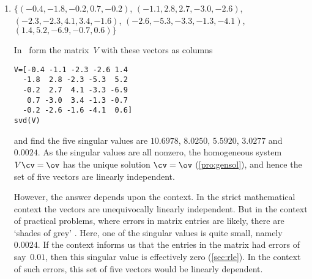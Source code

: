 \begin{example}
\begin{enumerate}



\item \(\{(-0.4,-1.8,-0.2, 0.7,-0.2)\), \((-1.1, 2.8, 2.7,-3.0,-2.6)\), \((-2.3,-2.3, 4.1, 3.4,-1.6)\), \((-2.6,-5.3,-3.3,-1.3,-4.1)\), \(( 1.4, 5.2,-6.9,-0.7, 0.6)\}\)
\begin{solution} 
In \script\ form the matrix~\(V\) with these vectors as columns
\begin{verbatim}
V=[-0.4 -1.1 -2.3 -2.6 1.4
  -1.8  2.8 -2.3 -5.3  5.2
  -0.2  2.7  4.1 -3.3 -6.9
   0.7 -3.0  3.4 -1.3 -0.7
  -0.2 -2.6 -1.6 -4.1  0.6]
svd(V)
\end{verbatim}
\setbox\ajrqrbox\hbox{}%
\marginajrbox%
and find the five singular values are \(10.6978\), \(8.0250\), \(5.5920\), \(3.0277\) and~\(0.0024\).
As the singular values are all nonzero, the homogeneous system \(V\cv=\ov\) has the unique solution \(\cv=\ov\) (\cref{pro:gensol}), and hence the set of five vectors are linearly independent.

However, the answer depends upon the context.  
In the strict mathematical context the vectors are unequivocally linearly independent.
But in the context of practical problems, where errors in matrix entries are likely, there are `shades of grey' . 
Here, one of the singular values is quite small, namely~\(0.0024\).
If the context informs us that the entries in the matrix had errors of say~\(0.01\), then this singular value is effectively zero (\cref{sec:rle}).
In the context of such errors, this set of five vectors would be  linearly dependent.
\end{solution}


\end{enumerate}
\end{example}













